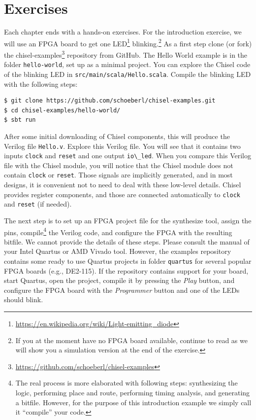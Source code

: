 \documentclass[%
    10pt,
    headinclude, footexclude,
    openright, %
    notitlepage,
    cleardoubleempty,
    headsepline,
    pointlessnumbers,
    bibtotoc, idxtotoc,
    ]{scrbook}
\newcommand{\code}[1]{{\lstinline[basicstyle=\small\ttfamily]{#1}}}
\newcommand{\myref}[2]{\href{#1}{#2}}
\renewcommand{\myref}[2]{{#2}{\footnote{\url{#1}}}}
\begin{document}
\section{Exercises}

Each chapter ends with a hands-on exercises. For the introduction exercise, we will use an
FPGA board to get one \myref{https://en.wikipedia.org/wiki/Light-emitting_diode}{LED}
blinking.\footnote{If you at the moment have no FPGA board available, continue to read
as we will show you a simulation version at the end of the exercise.}
As a first step clone (or fork) the \myref{https://github.com/schoeberl/chisel-examples}{chisel-examples}
repository from GitHub.
The Hello World example is in the folder \code{hello-world}, set up as
a minimal project. You can explore the Chisel code of the blinking LED
in \code{src/main/scala/Hello.scala}.
Compile the blinking LED with the following steps:

\begin{verbatim}
$ git clone https://github.com/schoeberl/chisel-examples.git
$ cd chisel-examples/hello-world/
$ sbt run
\end{verbatim}

After some initial downloading of Chisel components, this will produce the Verilog file \code{Hello.v}.
Explore this Verilog file. You will see that it contains two inputs \code{clock} and \code{reset}
and one output \code{io\_led}. When you compare this Verilog file with the Chisel module,
you will notice that the Chisel module does not contain \code{clock} or \code{reset}.
Those signals are implicitly generated, and in most designs, it is convenient not to need to
deal with these low-level details. Chisel provides register components, and those
are connected automatically to \code{clock} and \code{reset} (if needed).

The next step is to set up an FPGA project file for the synthesize tool, assign the pins,
compile\footnote{The real process is more elaborated with following steps: synthesizing the logic,
performing place and route, performing timing analysis, and generating a bitfile.
However, for the purpose of this introduction example we simply call it ``compile''
your code.} the Verilog code, and configure the FPGA with the resulting bitfile.
We cannot provide the details of these steps. Please consult the manual of
your Intel Quartus or AMD Vivado tool.
However, the examples repository contains some ready to use Quartus
projects in folder \code{quartus} for several popular FPGA boards (e.g., DE2-115).
If the repository contains support for your board, start Quartus, open the project,
compile it by pressing the \emph{Play} button, and configure the FPGA board
with the \emph{Programmer} button and one of the LEDs should blink.
\end{document}
